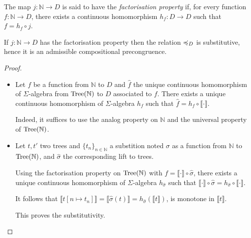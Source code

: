 \begin{definition}
    The map $j\colon \mathbb{N} \to D$ is said to have  the \emph{factorisation property} if,
    for every function $f \colon \mathbb{N} \to D$, there exists a 
    continuous homomorphism $h_f : D \to D$ such that $f = h_f \circ j$.
    \begin{center}
    \end{center}
\end{definition}
\begin{proposition}
If $j\colon \mathbb{N} \to D$ has the factorisation property then 
the relation $\preccurlyeq_D$ is substitutive, hence it is an admissible compositional precongruence.
\end{proposition}

\begin{proof}
    \begin{itemize}
        \item Let $f$ be a function from $\mathbb{N}$ to $D$
            and $\hat{f}$ the unique continuous homomorphism of 
            $\Sigma$-algebra from $\textnormal{Tree}(\mathbb{N})$ to $D$ associated to $f$.
            There exists a unique continuous homomorphism of $\Sigma$-algebra 
            $h_f$ such that $\hat{f} = h_f \circ \llbracket \cdot \rrbracket$.

            Indeed, it suffices to use the analog property on $\mathbb{N}$
            and the universal property of $\textnormal{Tree}(\mathbb{N})$.
        
        \item Let $t,t'$ two trees and $\{ t_n \}_{n \in \mathbb{N}}$
            a substition noted $\sigma$ as a function from $\mathbb{N}$ to
            $\textnormal{Tree}(\mathbb{N})$, and $\hat{\sigma}$ the corresponding 
            lift to trees.

            Using the factorisation property on $\textnormal{Tree}(\mathbb{N})$
            with $f = \llbracket \cdot \rrbracket \circ \hat{\sigma}$,
            there exists a unique continuous homomorphism of 
            $\Sigma$-algebra $h_{\hat{\sigma}}$ such that $\llbracket \cdot
            \rrbracket \circ \hat{\sigma} = h_{\hat{\sigma}} \circ \llbracket
            \cdot \rrbracket$.

            It follows that $\llbracket t[n \mapsto t_n] \rrbracket 
            = \llbracket \hat{\sigma}(t) \rrbracket = h_{\hat{\sigma}} (\llbracket
            t \rrbracket )$, is monotone in $\llbracket t \rrbracket$.

            This proves the substitutivity.
            
    \end{itemize}
\end{proof}


